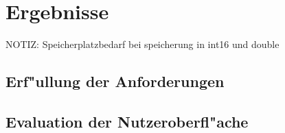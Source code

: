 \chapter{Ergebnisse}

NOTIZ: Speicherplatzbedarf bei speicherung in int16 und double

\section{Erf"ullung der Anforderungen}

\section{Evaluation der Nutzeroberfl"ache}

